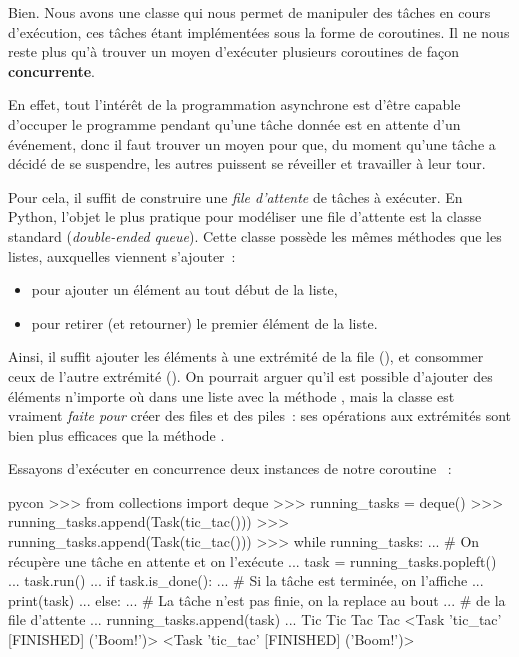 \documentclass[small]{zmdocument}
\begin{document}
Bien. Nous avons une classe qui nous permet de manipuler des tâches en cours
d’exécution, ces tâches étant implémentées sous la forme de coroutines. Il ne
nous reste plus qu’à trouver un moyen d’exécuter plusieurs coroutines de façon
\textbf{concurrente}.



En effet, tout l’intérêt de la programmation asynchrone est d’être capable d’occuper le
programme pendant qu’une tâche donnée est en attente d’un événement, donc il faut trouver un moyen
pour que, du moment qu’une tâche a décidé de se suspendre, les autres puissent se réveiller et travailler à leur tour.



Pour cela, il suffit de construire une \textit{file d’attente} de tâches à exécuter.
En Python, l’objet le plus pratique pour modéliser une file d’attente est la
classe standard  (\textit{double-ended queue}). Cette classe
possède les mêmes méthodes que les listes, auxquelles viennent s’ajouter :



\begin{itemize}
\item\relax {} pour ajouter un élément au tout début de la liste,
\item\relax {} pour retirer (et retourner) le premier élément de la liste.
\end{itemize}


Ainsi, il suffit ajouter les éléments à une extrémité de la file (),
et consommer ceux de l’autre extrémité (). On pourrait arguer qu’il
est possible d’ajouter des éléments n’importe où dans une liste avec la méthode
, mais la classe  est vraiment \textit{faite pour} créer des files et
des piles : ses opérations aux extrémités sont bien plus efficaces que la
méthode .



Essayons d’exécuter en concurrence deux instances de notre coroutine  :



\begin{CodeBlock}{pycon}
>>> from collections import deque
>>> running_tasks = deque()
>>> running_tasks.append(Task(tic_tac()))
>>> running_tasks.append(Task(tic_tac()))
>>> while running_tasks:
...     # On récupère une tâche en attente et on l'exécute
...     task = running_tasks.popleft()
...     task.run()
...     if task.is_done():
...         # Si la tâche est terminée, on l'affiche
...         print(task)
...     else:
...         # La tâche n'est pas finie, on la replace au bout
...         # de la file d'attente
...         running_tasks.append(task)
...
Tic
Tic
Tac
Tac
<Task 'tic_tac' [FINISHED] ('Boom!')>
<Task 'tic_tac' [FINISHED] ('Boom!')>
\end{CodeBlock}
\end{document}
